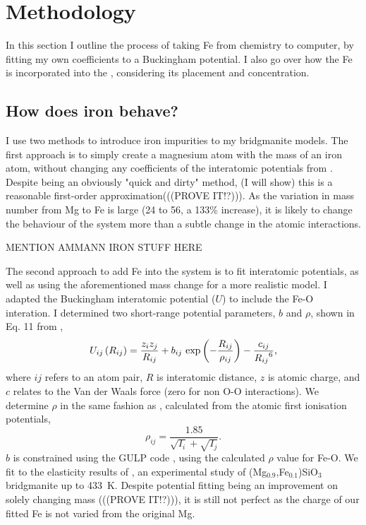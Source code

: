 \section{Methodology}

In this section I outline the process of taking Fe from chemistry to computer, by fitting my own coefficients to a Buckingham potential. I also go over how the Fe is incorporated into the \mgsio, considering its placement and concentration.

\subsection{How does iron behave?} 

I use two methods to introduce iron impurities to my bridgmanite models. The first approach is to simply create a magnesium atom with the mass of an iron atom, without changing any coefficients of the interatomic potentials from \citet{Oganov2000}. Despite being an obviously "quick and dirty" method, (I will show) this is a reasonable first-order approximation(((PROVE IT!?))). As the variation in mass number from Mg to Fe is large (24 to 56, a 133\% increase), it is likely to change the behaviour of the system more than a subtle change in the atomic interactions.

MENTION AMMANN IRON STUFF HERE

The second approach to add Fe into the \mgsios system is to fit interatomic potentials, as well as using the aforementioned mass change for a more realistic model. I adapted the \citet{Oganov2000} \mgsios Buckingham interatomic potential ($U$) to include the Fe-O interation. I determined two short-range potential parameters, $b$ and $\rho$, shown in Eq. 11 from \citet{Oganov2000},
%
\begin{equation}
U_{ij}\left ( R_{ij} \right ) = \frac{z_{i}z_{j}}{R_{ij}} + b_{ij}\ \textup{exp}\left ( - \frac{R_{ij}}{\rho_{ij}} \right ) - \frac{c_{ij}}{{R_{ij}}^{6}}, \label{og_buck}
\end{equation}
%
where $ij$ refers to an atom pair, $R$ is interatomic distance, $z$ is atomic charge, and $c$ relates to the Van der Waals force (zero for non O-O interactions). We determine $\rho$ in the same fashion as \citet{Oganov2000}, calculated from the atomic first ionisation potentials,
%
\begin{equation}
\rho_{ij} = \frac{1.85}{\sqrt{I_{i}}+\sqrt{I_{j}}}.  \label{urusov}
\end{equation}
%
$b$ is constrained using the GULP code \citep{Gale1997}, using the calculated $\rho$ value for Fe-O. We fit to the elasticity results of \citet{Parise1990}, an experimental study of (Mg$_{0.9}$,Fe$_{0.1}$)SiO$_3$ bridgmanite up to 433~K. Despite potential fitting being an improvement on solely changing mass (((PROVE IT!?))), it is still not perfect as the charge of our fitted Fe is not varied from the original Mg.


